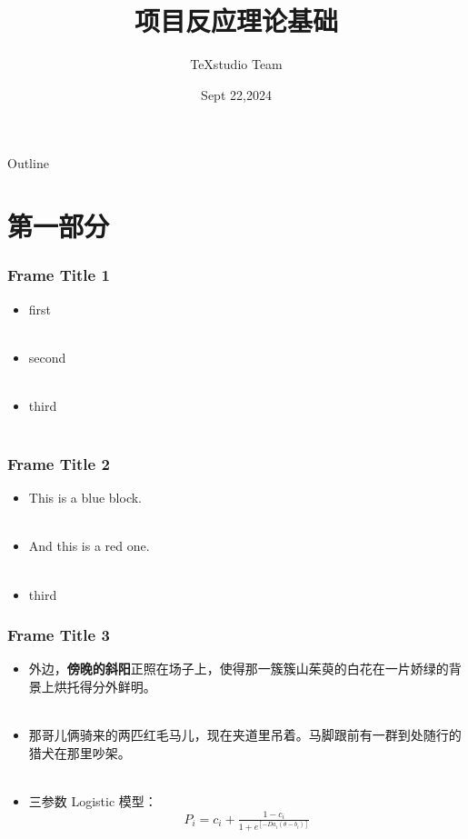 \documentclass{beamer}
\title{项目反应理论基础}
\author{TeXstudio Team}
\date{Sept 22,2024}
\begin{document}
	\begin{frame}
		\maketitle
	\end{frame}
	\begin{frame}{Outline} %
		\tableofcontents
	\end{frame}
	\section{第一部分}
	\begin{frame}
		\frametitle{Frame Title 1}
		\begin{itemize} 
			\item first \\~\\
			\item second \\~\\
			\item third \\~\\
		\end{itemize}
	\end{frame}
	\begin{frame}
		\frametitle{Frame Title 2}
		\begin{itemize} 
			\item {\color{blue} This is a blue block.} \\~\\
			\item {\color{red} And this is a red one.} \\~\\
			\item third
		\end{itemize}
	\end{frame}
	\begin{frame}
		\frametitle{Frame Title 3}
		\begin{itemize} 
			\item 外边，\textbf {傍晚的斜阳}正照在场子上，使得那一簇簇山茱萸的白花在一片娇绿的背景上烘托得分外鲜明。\\~\\
			\item 那哥儿俩骑来的两匹红毛马儿，现在夹道里吊着。马脚跟前有一群到处随行的猎犬在那里吵架。\\~\\
			\item 三参数 Logistic 模型：
			$$
			P_{i}=c_{i} +\tfrac{1-c_{i}}{1+e^{[-Da_{i}(\theta -b_{i})]}}
			$$
		\end{itemize}	
	\end{frame}
\end{document}
